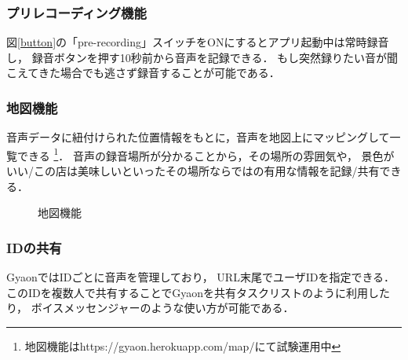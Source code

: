 \subsubsection{プリレコーディング機能}
図\ref{button}の「pre-recording」スイッチをONにするとアプリ起動中は常時録音し，
録音ボタンを押す10秒前から音声を記録できる．
もし突然録りたい音が聞こえてきた場合でも逃さず録音することが可能である．

\subsubsection{地図機能}
音声データに紐付けられた位置情報をもとに，音声を地図上にマッピングして一覧できる
\footnote{\textsf{地図機能はhttps://gyaon.herokuapp.com/map/にて試験運用中}}．
音声の録音場所が分かることから，その場所の雰囲気や，
景色がいい/この店は美味しいといったその場所ならではの有用な情報を記録/共有できる．

\begin{figure}[H]
\centering
{}
\caption{地図機能}
\label{map}
\end{figure}

\subsubsection{IDの共有}
GyaonではIDごとに音声を管理しており，
URL末尾でユーザIDを指定できる．
このIDを複数人で共有することでGyaonを共有タスクリストのように利用したり，
ボイスメッセンジャーのような使い方が可能である．

